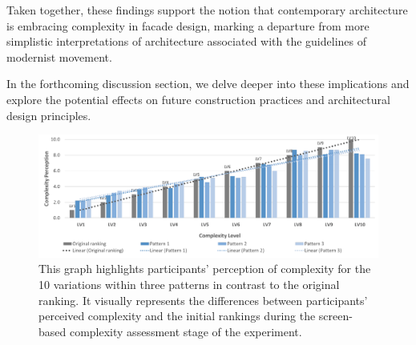 Taken together, these findings support the notion that contemporary architecture is embracing complexity in facade design, marking a departure from more simplistic interpretations of architecture associated with the guidelines of modernist movement.

In the forthcoming discussion section, we delve deeper into these implications and explore the potential effects on future construction practices and architectural design principles.



    \begin{figure}[htb]
      \centering
      \includegraphics[width= \linewidth, trim=0 0 0 0]{Images/ComplexityPerceptionPerLevel}
      \caption{This graph highlights participants' perception of complexity for the 10 variations within three patterns in contrast to the original ranking. It visually represents the differences between participants' perceived complexity and the initial rankings during the screen-based complexity assessment stage of the experiment.}
      \label{fig:ComplexityPerceptionPerLevel2}
    \end{figure}

